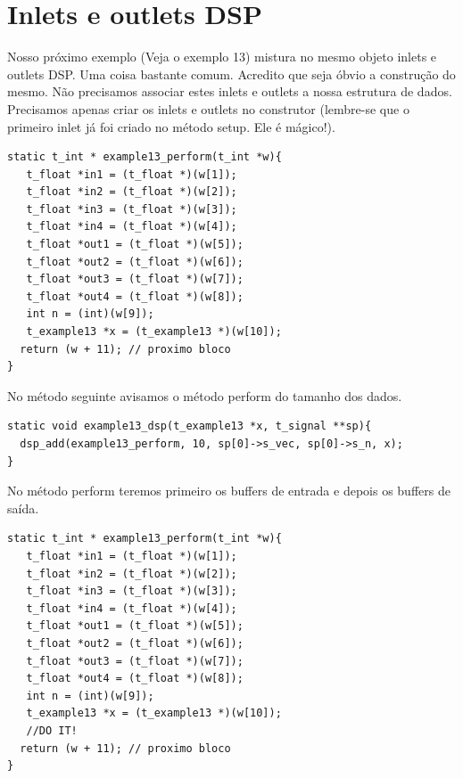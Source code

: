 \documentclass[10pt,a4paper]{report}
\begin{document}
\section{Inlets e outlets DSP}
Nosso próximo exemplo (Veja o exemplo 13) mistura no mesmo objeto inlets e outlets DSP. Uma coisa bastante comum. Acredito que seja óbvio a construção do mesmo. Não precisamos associar estes inlets e outlets a nossa estrutura de dados. Precisamos apenas criar os inlets e outlets no construtor (lembre-se que o primeiro inlet já foi criado no método setup. Ele é mágico!).

\begin{lstlisting}
static t_int * example13_perform(t_int *w){
   t_float *in1 = (t_float *)(w[1]);
   t_float *in2 = (t_float *)(w[2]);
   t_float *in3 = (t_float *)(w[3]);
   t_float *in4 = (t_float *)(w[4]);
   t_float *out1 = (t_float *)(w[5]);
   t_float *out2 = (t_float *)(w[6]);
   t_float *out3 = (t_float *)(w[7]);
   t_float *out4 = (t_float *)(w[8]);
   int n = (int)(w[9]);
   t_example13 *x = (t_example13 *)(w[10]);
  return (w + 11); // proximo bloco
}
\end{lstlisting}

No método seguinte avisamos o método perform do tamanho dos dados.
\begin{lstlisting}
static void example13_dsp(t_example13 *x, t_signal **sp){
  dsp_add(example13_perform, 10, sp[0]->s_vec, sp[0]->s_n, x);
}
\end{lstlisting}

No método perform teremos primeiro os buffers de entrada e depois os buffers de saída.

\begin{lstlisting}
static t_int * example13_perform(t_int *w){
   t_float *in1 = (t_float *)(w[1]);
   t_float *in2 = (t_float *)(w[2]);
   t_float *in3 = (t_float *)(w[3]);
   t_float *in4 = (t_float *)(w[4]);
   t_float *out1 = (t_float *)(w[5]);
   t_float *out2 = (t_float *)(w[6]);
   t_float *out3 = (t_float *)(w[7]);
   t_float *out4 = (t_float *)(w[8]);
   int n = (int)(w[9]);
   t_example13 *x = (t_example13 *)(w[10]);
   //DO IT!
  return (w + 11); // proximo bloco
}
\end{lstlisting}
\end{document}

